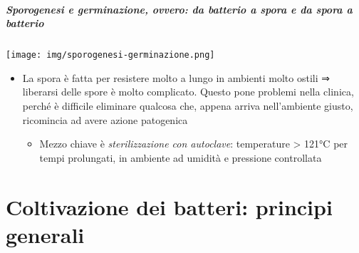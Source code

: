 \documentclass[italian,]{article}
\providecommand{\tightlist}{%
  \setlength{\itemsep}{0pt}\setlength{\parskip}{0pt}}
\newcommand{\normalbox}[2]{\begin{tcolorbox}[title=#1]#2\end{tcolorbox}} %
\begin{document}
\hypertarget{sporogenesi-e-germinazione-ovvero-da-batterio-a-spora-e-da-spora-a-batterio}{%
\subparagraph{Sporogenesi e germinazione, ovvero: da batterio a spora e
da spora a
batterio}\label{sporogenesi-e-germinazione-ovvero-da-batterio-a-spora-e-da-spora-a-batterio}}

\texttt{[image: img/sporogenesi-germinazione.png]}~

\normalbox{Implicazioni cliniche per i batteri sporigeni}{
\begin{itemize} \tightlist \item La spora è fatta per resistere molto a lungo in ambienti molto ostili ⇒ liberarsi delle spore è molto complicato. Questo pone problemi nella clinica, perché è difficile eliminare qualcosa che, appena arriva nell'ambiente giusto, ricomincia ad avere azione patogenica \begin{itemize} \tightlist \item Mezzo chiave è \emph{sterilizzazione con autoclave}: temperature \textgreater{} 121°C per tempi prolungati, in ambiente ad umidità e pressione controllata \end{itemize} \end{itemize}
}

\hypertarget{coltivazione-dei-batteri-principi-generali}{%
\section{Coltivazione dei batteri: principi
generali}\label{coltivazione-dei-batteri-principi-generali}}
\end{document}
